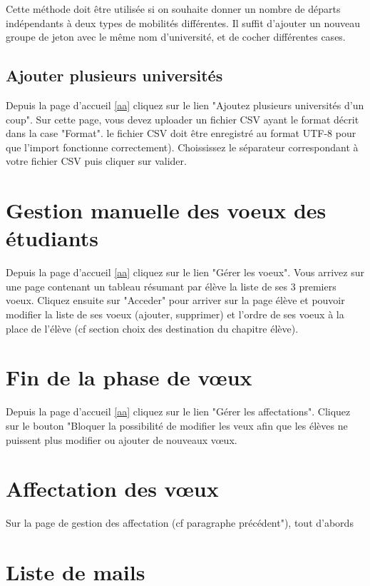 \smallbreak

Cette méthode doit être utilisée si on souhaite donner un nombre de départs indépendants à deux types de mobilités différentes. Il suffit d'ajouter un nouveau groupe de jeton avec le même nom d'université, et de cocher différentes cases.


\subsection{Ajouter plusieurs universités} 
\label{au}

Depuis la page d'accueil \ref{aa} cliquez sur le lien "Ajoutez plusieurs universités d'un coup". Sur cette page, vous devez uploader un fichier CSV ayant le format décrit dans la case "Format". \att le fichier CSV doit être enregistré au format UTF-8 pour que l'import fonctionne correctement). Choississez le séparateur correspondant à votre fichier CSV puis cliquer sur valider.

\section{Gestion manuelle des voeux des étudiants}

Depuis la page d'accueil \ref{aa} cliquez sur le lien "Gérer les voeux". Vous arrivez sur une page contenant un tableau résumant par élève la liste de ses 3 premiers voeux. Cliquez ensuite sur "Acceder" pour arriver sur la page élève et pouvoir modifier la liste de ses voeux (ajouter, supprimer) et l'ordre de ses voeux à la place de l'élève (cf section choix des destination du chapitre élève).

\section{Fin de la phase de vœux} 

Depuis la page d'accueil \ref{aa} cliquez sur le lien "Gérer les affectations". Cliquez sur le bouton "Bloquer la possibilité de modifier les veux afin que les élèves ne puissent plus modifier ou ajouter de nouveaux vœux.

\section{Affectation des vœux}

Sur la page de gestion des affectation (cf paragraphe précédent"), tout d'abords

\section{Liste de mails}

